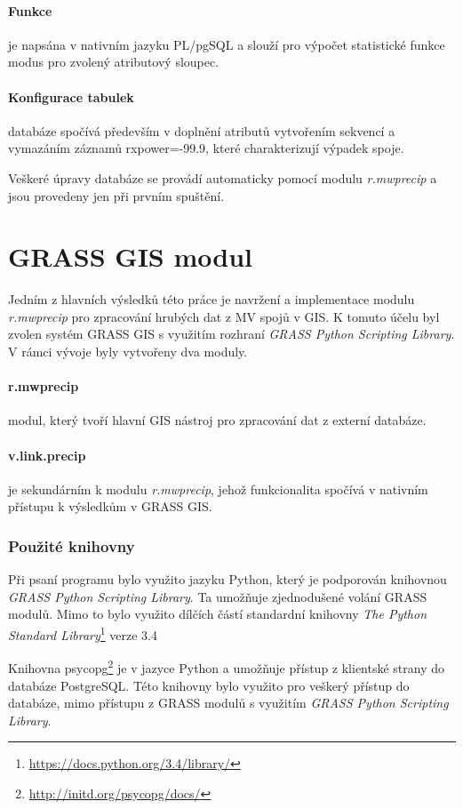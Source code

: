 \documentclass[a4paper,12pt,oneside]{report}
\begin{document}
\paragraph*{Funkce} je napsána v nativním jazyku PL/pgSQL a slouží pro výpočet statistické funkce modus pro zvolený atributový sloupec. 

\paragraph*{Konfigurace tabulek} databáze spočívá především v doplnění atributů vytvořením sekvencí a vymazáním záznamů rxpower=-99.9, které charakterizují výpadek spoje. 

\bigskip

Veškeré úpravy databáze se provádí automaticky pomocí modulu \textit{r.mwprecip} a jsou provedeny jen při prvním spuštění. 
\section{GRASS GIS modul}
Jedním z hlavních výsledků této práce je navržení a implementace modulu \textit{r.mwprecip} pro zpracování hrubých dat z MV spojů v GIS. K tomuto účelu byl zvolen systém GRASS GIS s využitím rozhraní \textit{GRASS Python Scripting Library}. V rámci vývoje byly vytvořeny dva moduly.

\paragraph*{r.mwprecip}  modul, který tvoří hlavní GIS nástroj pro zpracování dat z externí databáze.
\paragraph*{v.link.precip} je sekundárním  k modulu  \textit{r.mwprecip}, jehož funkcionalita spočívá v nativním přístupu k výsledkům   v GRASS GIS.  

\subsubsection{Použité knihovny}
Při psaní programu bylo využito jazyku Python, který je podporován knihovnou  \textit{GRASS Python Scripting Library}\cite{spygrass}. Ta umožňuje zjednodušené volání GRASS modulů. Mimo to bylo využito dílčích částí standardní knihovny \textit{The Python Standard Library}\footnote{\url{https://docs.python.org/3.4/library/}} verze 3.4

Knihovna psycopg\footnote{\url{http://initd.org/psycopg/docs/}} je v jazyce Python a  umožňuje přístup z klientské strany do databáze PostgreSQL. Této knihovny bylo využito pro veškerý přístup do databáze, mimo přístupu z GRASS modulů s využitím \textit{GRASS Python Scripting Library}.
\end{document}
